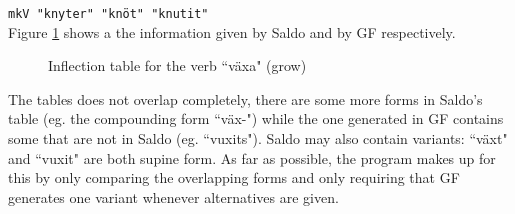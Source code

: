 \documentclass{report}
\begin{document}
\verb-mkV "knyter" "knöt" "knutit"-\\


Figure \ref{pic:TabVax} shows a the information given by Saldo and by GF respectively.\\
\begin{figure}[h]
  \begin{center}
\hspace{5mm}
\caption{Inflection table for the verb ``växa" (grow)}
\label{pic:TabVax}
  \end{center}
\end{figure}
The tables does not overlap completely, there are some more forms in Saldo's table (eg. the 
compounding form ``väx-")
while the one generated in GF contains some that are not in Saldo (eg. ``vuxits").
Saldo may also contain variants: ``växt" and ``vuxit" are both supine form.
As far as possible, the program makes up for this by only comparing the overlapping forms
and only requiring that GF generates one variant whenever alternatives are given. \\
\end{document}
